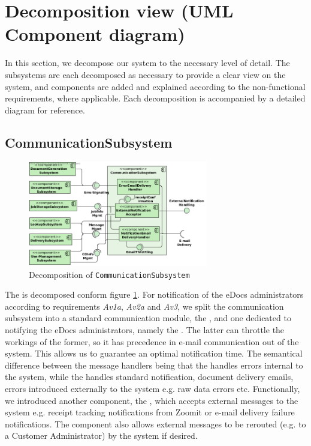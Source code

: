 \section{Decomposition view (UML Component diagram)}\label{sec:decomposition}
In this section, we decompose our system to the necessary level of detail. The subsystems are each decomposed as necessary to provide a clear view on the system, and components are added and explained according to the non-functional requirements, where applicable. Each decomposition is accompanied by a detailed diagram for reference.

\subsection{CommunicationSubsystem}
\begin{figure}[!htp]
    \centering
    \includegraphics[width=0.7\textwidth]{figures/Communication Subsystem.png}
    \caption{Decomposition of \texttt{CommunicationSubsystem}}\label{fig:decomp-commsub}
\end{figure}

The  is decomposed conform figure \ref{fig:decomp-commsub}. For notification of the eDocs administrators according to requirements \emph{Av1a}, \emph{Av2a} and \emph{Av3}, we split the communication subsystem into a standard communication module, the , and one dedicated to notifying the eDocs administrators, namely the . The latter can throttle the workings of the former, so it has precedence in e-mail communication out of the system. This allows us to guarantee an optimal notification time. The semantical difference between the message handlers being that the  handles errors internal to the system, while the  handles standard notification, document delivery emails, errors introduced externally to the system e.g. raw data errors etc. Functionally, we introduced another component, the , which accepts external messages to the system e.g. receipt tracking notifications from Zoomit or e-mail delivery failure notifications. The component also allows external messages to be rerouted (e.g. to a Customer Administrator) by the system if desired.

